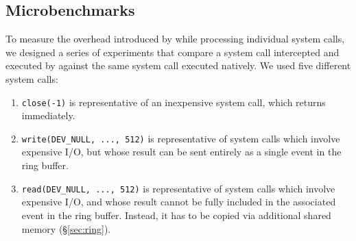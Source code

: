 \subsection{Microbenchmarks}
\label{sec:microbenchmarks}

To measure the overhead introduced by \varan while processing individual
system calls, we designed a series of experiments that compare a
system call intercepted and executed by \varan against the same system
call executed natively. We used five different system calls:

\begin{enumerate}


\item \lstinline`close(-1)` is representative of an inexpensive system call,
  which returns immediately.


\item \lstinline`write(DEV_NULL, ..., 512)` is representative of system
  calls which involve expensive I/O, but whose result can be sent
  entirely as a single event in the ring buffer.


\item \lstinline`read(DEV_NULL, ..., 512)` is representative of system calls which
  involve expensive I/O, and whose result cannot be fully included in the
  associated event in the ring buffer.  Instead, it has to be copied via
  additional shared memory (\S\ref{sec:ring}).



\end{enumerate}
